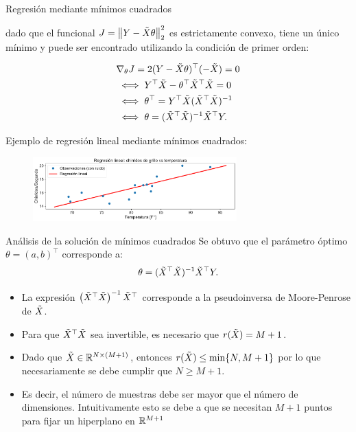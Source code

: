 \documentclass[handout, 9pt]{beamer}
\begin{document}
\begin{frame}{Regresión mediante mínimos cuadrados}

dado que el funcional $J=\left\lVert Y-\tilde{X}\theta\right\rVert_2^2$ es estrictamente convexo, tiene un único mínimo y puede ser encontrado utilizando la condición de primer orden:

\begin{align*}
	&\nabla_\theta J= 2(Y-\tilde{X}\theta)^\top(-\tilde{X})=0\nonumber \\
	& \iff Y^\top\tilde{X} -\theta^\top\tilde{X}^\top\tilde{X} = 0\nonumber\\
	& \iff \theta^\top = Y^\top \tilde{X}(\tilde{X}^\top\tilde{X})^{-1}\nonumber\\
	& \iff \theta = (\tilde{X}^\top\tilde{X})^{-1}\tilde{X}^\top Y. \label{eq:sol_mse}
\end{align*}

\pause

Ejemplo de regresión lineal mediante mínimos cuadrados:
\begin{figure}[h]
	\centering
	\includegraphics[width=0.7\textwidth]{../../img/cap2_chirridos.pdf}\\
\end{figure}
	
\end{frame}

\begin{frame}{Análisis de la solución de mínimos cuadrados}
Se obtuvo que el parámetro óptimo $\theta=(a,b)^\top$ corresponde a:
\begin{equation*}
	\theta = (\tilde{X}^\top\tilde{X})^{-1}\tilde{X}^\top Y.
\end{equation*}\pause

\begin{itemize}
	\item La expresión $\left(\tilde{X}^\top\tilde{X} \right)^{-1} \tilde{X}^\top$ corresponde a la pseudoinversa de Moore-Penrose de $\tilde{X}$.\pause
	\item Para que $\tilde{X}^\top\tilde{X}$ sea invertible, es necesario que $r(\tilde{X})=M+1$.\pause
	\item Dado que $\tilde{X}\in\mathbb{R}^{N\times (M+1)}$, entonces $r(\tilde{X})\leq\min\{N,M+1\}$ por lo que necesariamente se debe cumplir que $N\geq M+1$.\pause
	\item Es decir, el número de muestras debe ser mayor que el número de dimensiones. Intuitivamente esto se debe a que se necesitan $M+1$ puntos para fijar un hiperplano en $\mathbb{R}^{M+1}$
\end{itemize}
	
\end{frame}
\end{document}
